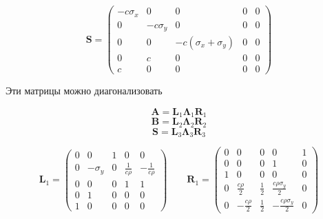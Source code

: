 \begin{equation*}
	\pmb{S} = \begin{pmatrix}
        -c \sigma_x & 0 & 0 & 0 & 0 \\
        0 & -c \sigma_y & 0 & 0 & 0 \\
        0 & 0 & -c (\sigma_x + \sigma_y) & 0 & 0 \\
        0 & c & 0 & 0 & 0 \\
        c & 0 & 0 & 0 & 0
    \end{pmatrix}
\end{equation*}

Эти матрицы можно диагонализовать

\begin{equation*}
    \pmb{A} = \pmb{L}_1 \pmb{\Lambda}_1 \pmb{R}_1
\end{equation*}
\begin{equation*}
    \pmb{B} = \pmb{L}_2 \pmb{\Lambda}_2 \pmb{R}_2
\end{equation*}
\begin{equation*}
    \pmb{S} =\pmb{L}_3 \pmb{\Lambda}_3 \pmb{R}_3
\end{equation*}


\begin{equation*}
    \pmb{L}_1 = \begin{pmatrix}
        0 & 0 & 1 & 0 & 0 \\
        0 & -\sigma_y & 0 & \frac{1}{c \rho} & -\frac{1}{c \rho} \\
        0 & 0 & 0 & 1 & 1 \\
        0 & 1 & 0 & 0 & 0 \\
        1 & 0 & 0 & 0 & 0
    \end{pmatrix} \qquad
    \pmb{R}_1 = \begin{pmatrix}
        0 & 0 & 0 & 0 & 1 \\
        0 & 0 & 0 & 1 & 0 \\
        1 & 0 & 0 & 0 & 0 \\
        0 & \frac{c \rho}{2} & \frac{1}{2} & \frac{c \rho \sigma_y}{2} & 0  \\
        0 & -\frac{c \rho}{2}  & \frac{1}{2} & - \frac{c \rho \sigma_y}{2} & 0
    \end{pmatrix}
\end{equation*}
    

